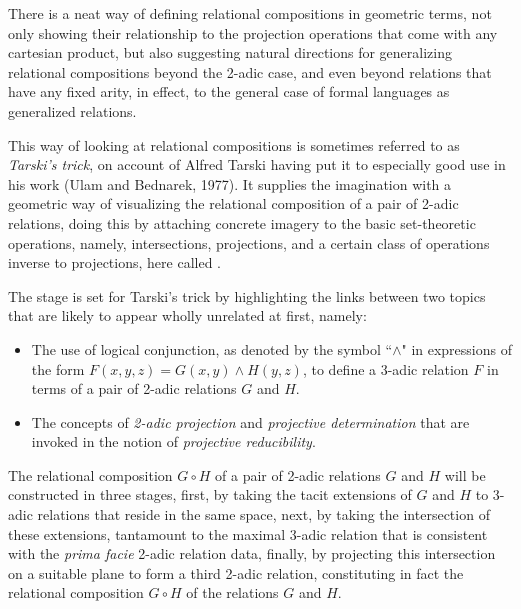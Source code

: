 \documentclass[12pt]{article}
\begin{document}

There is a neat way of defining relational compositions in geometric terms, not only showing their relationship to the projection operations that come with any cartesian product, but also suggesting natural directions for generalizing relational compositions beyond the 2-adic case, and even beyond relations that have any fixed arity, in effect, to the general case of formal languages as generalized relations.

This way of looking at relational compositions is sometimes referred to as \textit{Tarski's trick}, on account of Alfred Tarski having put it to especially good use in his work (Ulam and Bednarek, 1977).  It supplies the imagination with a geometric way of visualizing the relational composition of a pair of 2-adic relations, doing this by attaching concrete imagery to the basic set-theoretic operations, namely, intersections, projections, and a certain class of operations inverse to projections, here called \textit{}.

The stage is set for Tarski's trick by highlighting the links between two topics that are likely to appear wholly unrelated at first, namely:

\begin{itemize}
\item
The use of logical conjunction, as denoted by the symbol ``$\land$" in expressions of the form $F(x, y, z) = G(x, y) \land H(y, z)$, to define a 3-adic relation $F$ in terms of a pair of 2-adic relations $G$ and $H$.
\item
The concepts of \textit{2-adic projection} and \textit{projective determination} that are invoked in the notion of \textit{projective reducibility}.
\end{itemize}

The relational composition $G \circ H$ of a pair of 2-adic relations $G$ and $H$ will be constructed in three stages, first, by taking the tacit extensions of $G$ and $H$ to 3-adic relations that reside in the same space, next, by taking the intersection of these extensions, tantamount to the maximal 3-adic relation that is consistent with the \textit{prima facie} 2-adic relation data, finally, by projecting this intersection on a suitable plane to form a third 2-adic relation, constituting in fact the relational composition $G \circ H$ of the relations $G$ and $H$.
\end{document}
